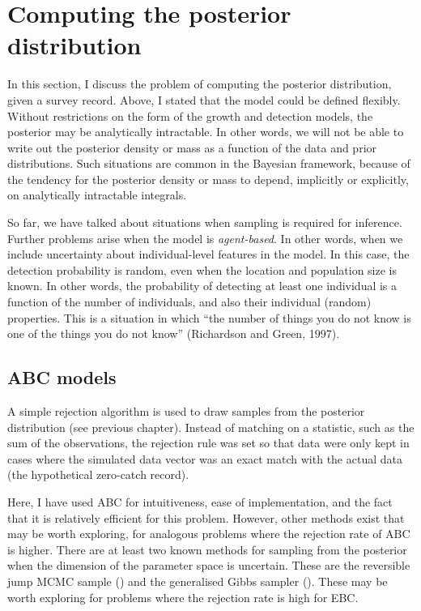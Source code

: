 \documentclass[
]{book}
\begin{document}
\hypertarget{computing-the-posterior-distribution}{%
\section{Computing the posterior distribution}\label{computing-the-posterior-distribution}}

In this section, I discuss the problem of computing the posterior distribution, given a survey record. Above, I stated that the model could be defined flexibly. Without restrictions on the form of the growth and detection models, the posterior may be analytically intractable. In other words, we will not be able to write out the posterior density or mass as a function of the data and prior distributions. Such situations are common in the Bayesian framework, because of the tendency for the posterior density or mass to depend, implicitly or explicitly, on analytically intractable integrals.

So far, we have talked about situations when sampling is required for inference. Further problems arise when the model is \emph{agent-based}. In other words, when we include uncertainty about individual-level features in the model. In this case, the detection probability is random, even when the location and population size is known. In other words, the probability of detecting at least one individual is a function of the number of individuals, and also their individual (random) properties. This is a situation in which ``the number of things you do not know is one of the things you do not know'' (Richardson and Green, 1997).

\hypertarget{abc-models}{%
\subsection{ABC models}\label{abc-models}}

A simple rejection algorithm is used to draw samples from the posterior distribution (see previous chapter). Instead of matching on a statistic, such as the sum of the observations, the rejection rule was set so that data were only kept in cases where the simulated data vector was an exact match with the actual data (the hypothetical zero-catch record).

Here, I have used ABC for intuitiveness, ease of implementation, and the fact that it is relatively efficient for this problem. However, other methods exist that may be worth exploring, for analogous problems where the rejection rate of ABC is higher. There are at least two known methods for sampling from the posterior when the dimension of the parameter space is uncertain. These are the reversible jump MCMC sample (\citet{green1995}) and the generalised Gibbs sampler (\citet{keith2015}). These may be worth exploring for problems where the rejection rate is high for EBC.
\end{document}
